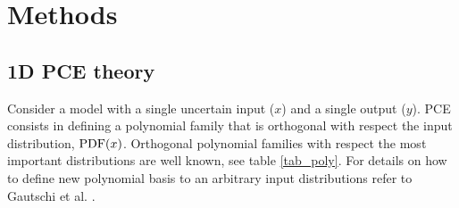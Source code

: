 \documentclass[preprint,12pt]{elsarticle}
\begin{document}
\section{Methods}
\label{sec_Methods}

\subsection{1D PCE theory}


Consider a model with a single uncertain input ($x$) and a single output ($y$). PCE consists in defining a polynomial family that is orthogonal with respect the input distribution, $\mathrm{PDF}(x)$. Orthogonal polynomial families with respect the most important distributions are well known, see table \ref{tab_poly}. For details on how to define new polynomial basis to an arbitrary input distributions refer to Gautschi et al. \cite{gautschi1994algorithm}.

\begin{table}[h!]
\begin{center}
\caption{Classical orthogonal polynomial families.}
\label{tab_poly}
\end{center}
\end{table}



\end{document}
